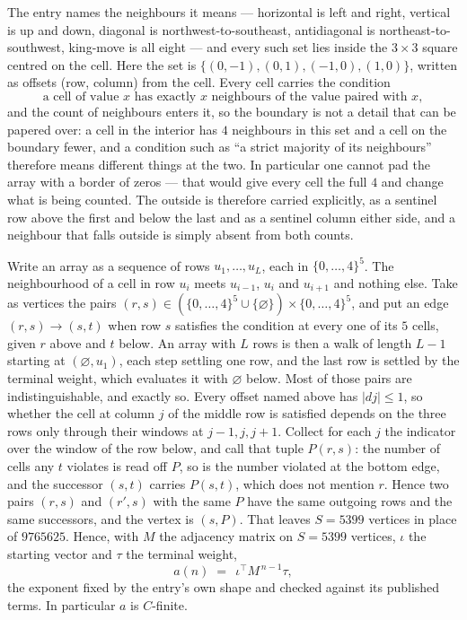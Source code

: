 \documentclass[11pt,a4paper]{article}
\theoremstyle{plain}
\theoremstyle{definition}
\begin{document}
The entry names the neighbours it means --- horizontal is left and right, vertical is up and
down, diagonal is northwest-to-southeast, antidiagonal is northeast-to-southwest, king-move is
all eight --- and every such set lies inside the $3\times3$ square centred on the cell. Here
the set is $\{(0,-1), (0,1), (-1,0), (1,0)\}$, written as offsets (row, column) from the cell. Every cell carries
the condition
\[
\text{a cell of value }x\text{ has exactly }x\text{ neighbours of the value paired with }x,
\]
and the count of neighbours enters it, so the boundary is not a detail that can be papered
over: a cell in the interior has $4$ neighbours in this set and a cell on the boundary
fewer, and a condition such as ``a strict majority of its neighbours'' therefore means
different things at the two. In particular one cannot pad the array with a border of zeros ---
that would give every cell the full $4$ and change what is being counted. The outside is
therefore carried
explicitly, as a sentinel row above the first and below the last and as a sentinel column
either side, and a neighbour that falls outside is simply absent from both counts.

Write an array as a sequence of rows $u_1,\dots,u_L$, each in
$\{0,\dots,4\}^{5}$. The neighbourhood of a cell in row $u_i$ meets $u_{i-1}$,
$u_i$ and $u_{i+1}$ and nothing else. Take as vertices the pairs
$(r,s)\in(\{0,\dots,4\}^{5}\cup\{\varnothing\})\times\{0,\dots,4\}^{5}$,
and put an edge $(r,s)\to(s,t)$ when row $s$ satisfies the condition at every one of its
$5$ cells, given $r$ above and $t$ below. An array with $L$ rows is then a walk of length
$L-1$ starting at $(\varnothing,u_1)$, each step settling one row, and the last row is
settled by the terminal weight, which evaluates it with $\varnothing$ below. Most of those pairs are indistinguishable, and exactly so. Every offset named above has $|dj|\le 1$, so whether the cell at column $j$ of the middle row is satisfied depends on the three rows only through their windows at $j-1,j,j+1$. Collect for each $j$ the indicator over the window of the row below, and call that tuple $P(r,s)$: the number of cells any $t$ violates is read off $P$, so is the number violated at the bottom edge, and the successor $(s,t)$ carries $P(s,t)$, which does not mention $r$. Hence two pairs $(r,s)$ and $(r',s)$ with the same $P$ have the same outgoing rows and the same successors, and the vertex is $(s,P)$. That leaves $S=5399$ vertices in place of $9765625$. Hence,
with $M$ the adjacency matrix on $S=5399$ vertices, $\iota$ the starting vector and $\tau$ the
terminal weight,
\[
a(n)\;=\;\,\iota^{\!\top}M^{\,n-1}\tau ,
\]
the exponent fixed by the entry's own shape and checked against its published terms. In
particular $a$ is $C$-finite.
\end{document}
